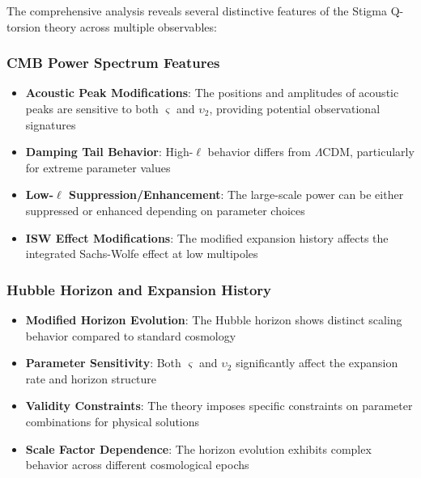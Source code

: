 \documentclass{article}
\begin{document}
The comprehensive analysis reveals several distinctive features of the Stigma Q-torsion theory across multiple observables:

\subsubsection{CMB Power Spectrum Features}
\begin{itemize}
\item \textbf{Acoustic Peak Modifications}: The positions and amplitudes of acoustic peaks are sensitive to both $\varsigma$ and $\upsilon_2$, providing potential observational signatures
\item \textbf{Damping Tail Behavior}: High-$\ell$ behavior differs from $\Lambda$CDM, particularly for extreme parameter values
\item \textbf{Low-$\ell$ Suppression/Enhancement}: The large-scale power can be either suppressed or enhanced depending on parameter choices
\item \textbf{ISW Effect Modifications}: The modified expansion history affects the integrated Sachs-Wolfe effect at low multipoles
\end{itemize}

\subsubsection{Hubble Horizon and Expansion History}
\begin{itemize}
\item \textbf{Modified Horizon Evolution}: The Hubble horizon shows distinct scaling behavior compared to standard cosmology
\item \textbf{Parameter Sensitivity}: Both $\varsigma$ and $\upsilon_2$ significantly affect the expansion rate and horizon structure
\item \textbf{Validity Constraints}: The theory imposes specific constraints on parameter combinations for physical solutions
\item \textbf{Scale Factor Dependence}: The horizon evolution exhibits complex behavior across different cosmological epochs
\end{itemize}
\end{document}
